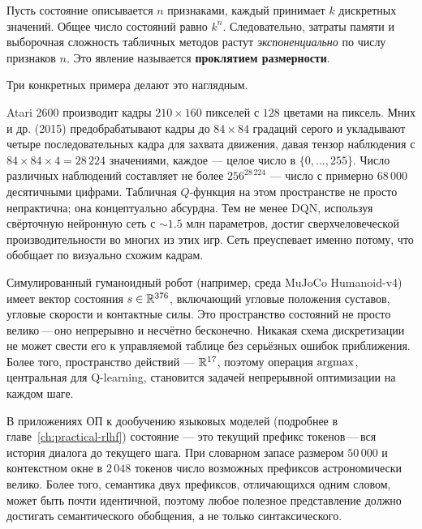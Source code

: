 \begin{definition}
\label{def:curse-dim}
Пусть состояние описывается $n$ признаками, каждый принимает $k$ дискретных значений.  Общее число состояний равно $k^n$.  Следовательно, затраты памяти и выборочная сложность табличных методов растут \emph{экспоненциально} по числу признаков $n$.  Это явление называется \textbf{проклятием размерности}.
\end{definition}

Три конкретных примера делают это наглядным.

\begin{example}
\label{ex:atari-states}
Atari 2600 производит кадры $210 \times 160$ пикселей с $128$ цветами на пиксель.  Мних и др. (2015) предобрабатывают кадры до $84 \times 84$ градаций серого и укладывают четыре последовательных кадра для захвата движения, давая тензор наблюдения с $84 \times 84 \times 4 = 28\,224$ значениями, каждое --- целое число в $\{0, \ldots, 255\}$.  Число различных наблюдений составляет не более $256^{28\,224}$ --- число с примерно $68\,000$ десятичными цифрами.  Табличная $Q$-функция на этом пространстве не просто непрактична; она концептуально абсурдна.  Тем не менее DQN, используя свёрточную нейронную сеть с $\sim 1.5$ млн параметров, достиг сверхчеловеческой производительности во многих из этих игр.  Сеть преуспевает именно потому, что обобщает по визуально схожим кадрам.
\end{example}

\begin{example}
\label{ex:robotics-states}
Симулированный гуманоидный робот (например, среда MuJoCo Humanoid-v4) имеет вектор состояния $s \in \mathbb{R}^{376}$, включающий угловые положения суставов, угловые скорости и контактные силы.  Это пространство состояний не просто велико\,---\,оно непрерывно и несчётно бесконечно.  Никакая схема дискретизации не может свести его к управляемой таблице без серьёзных ошибок приближения.  Более того, пространство действий --- $\mathbb{R}^{17}$, поэтому операция $\operatorname*{argmax}$, центральная для Q-learning, становится задачей непрерывной оптимизации на каждом шаге.
\end{example}

\begin{example}
\label{ex:language-states}
В приложениях ОП к дообучению языковых моделей (подробнее в главе~\ref{ch:practical-rlhf}) состояние --- это текущий префикс токенов\,---\,вся история диалога до текущего шага.  При словарном запасе размером $50\,000$ и контекстном окне в $2\,048$ токенов число возможных префиксов астрономически велико.  Более того, семантика двух префиксов, отличающихся одним словом, может быть почти идентичной, поэтому любое полезное представление должно достигать семантического обобщения, а не только синтаксического.
\end{example}


